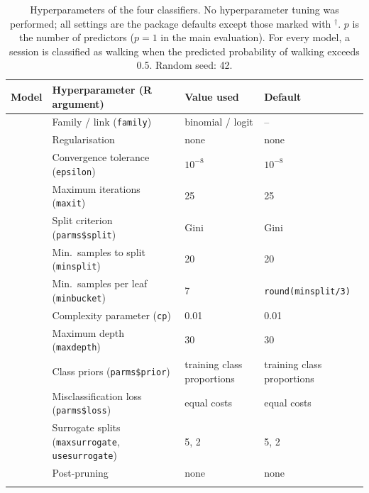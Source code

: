 \begin{table}[htbp]
  \centering
  \small
  \caption{Hyperparameters of the four classifiers. No hyperparameter tuning
  was performed; all settings are the package defaults except those marked
  with $^\dagger$. $p$ is the number of predictors ($p = 1$ in the main
  evaluation). For every model, a session is classified as walking when the
  predicted probability of walking exceeds 0.5. Random seed: 42.}
  \label{tab:model_hyperparameters}
  \begin{tabular}{llll}
    \toprule
    Model & Hyperparameter (R argument) & Value used & Default \\
    \midrule
      & Family / link (\texttt{family})        & binomial / logit & -- \\
      & Regularisation                         & none             & none \\
      & Convergence tolerance (\texttt{epsilon}) & $10^{-8}$      & $10^{-8}$ \\
      & Maximum iterations (\texttt{maxit})    & 25               & 25 \\
    \midrule
      & Split criterion (\texttt{parms\$split}) & Gini            & Gini \\
      & Min.\ samples to split (\texttt{minsplit}) & 20           & 20 \\
      & Min.\ samples per leaf (\texttt{minbucket}) & 7           & \texttt{round(minsplit/3)} \\
      & Complexity parameter (\texttt{cp})     & 0.01             & 0.01 \\
      & Maximum depth (\texttt{maxdepth})      & 30               & 30 \\
      & Class priors (\texttt{parms\$prior})   & training class proportions & training class proportions \\
      & Misclassification loss (\texttt{parms\$loss}) & equal costs & equal costs \\
      & Surrogate splits (\texttt{maxsurrogate}, \texttt{usesurrogate}) & 5, 2 & 5, 2 \\
      & Post-pruning                           & none             & none \\
    \midrule

\end{tabular}
\end{table}
